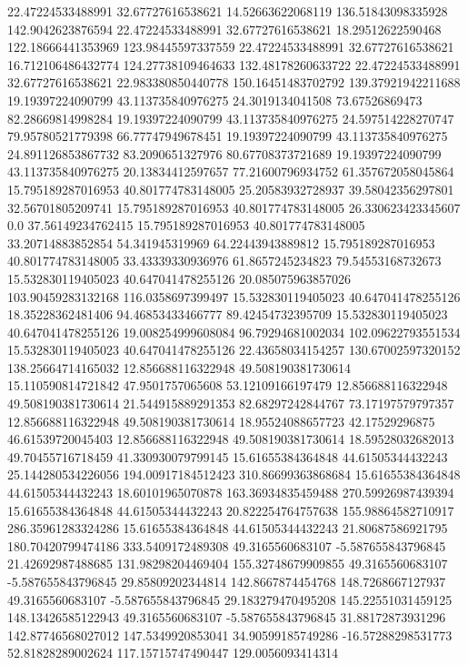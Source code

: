 22.47224533488991 32.67727616538621 14.52663622068119 136.51843098335928 142.9042623876594
22.47224533488991 32.67727616538621 18.29512622590468 122.18666441353969 123.98445597337559
22.47224533488991 32.67727616538621 16.712106486432774 124.27738109464633 132.48178260633722
22.47224533488991 32.67727616538621 22.983380850440778 150.16451483702792 139.37921942211688
19.19397224090799 43.113735840976275 24.3019134041508 73.67526869473 82.28669814998284
19.19397224090799 43.113735840976275 24.597514228270747 79.95780521779398 66.77747949678451
19.19397224090799 43.113735840976275 24.891126853867732 83.2090651327976 80.67708373721689
19.19397224090799 43.113735840976275 20.13834412597657 77.21600796934752 61.357672058045864
15.795189287016953 40.801774783148005 25.20583932728937 39.58042356297801 32.56701805209741
15.795189287016953 40.801774783148005 26.330623423345607 0.0 37.56149234762415
15.795189287016953 40.801774783148005 33.20714883852854 54.341945319969 64.22443943889812
15.795189287016953 40.801774783148005 33.43339330936976 61.8657245234823 79.54553168732673
15.532830119405023 40.647041478255126 20.085075963857026 103.90459283132168 116.0358697399497
15.532830119405023 40.647041478255126 18.35228362481406 94.46853433466777 89.42454732395709
15.532830119405023 40.647041478255126 19.008254999608084 96.79294681002034 102.09622793551534
15.532830119405023 40.647041478255126 22.43658034154257 130.67002597320152 138.25664714165032
12.856688116322948 49.508190381730614 15.110590814721842 47.9501757065608 53.12109166197479
12.856688116322948 49.508190381730614 21.544915889291353 82.68297242844767 73.17197579797357
12.856688116322948 49.508190381730614 18.95524088657723 42.17529296875 46.61539720045403
12.856688116322948 49.508190381730614 18.59528032682013 49.70455716718459 41.330930079799145
15.61655384364848 44.61505344432243 25.144280534226056 194.00917184512423 310.86699363868684
15.61655384364848 44.61505344432243 18.60101965070878 163.36934835459488 270.59926987439394
15.61655384364848 44.61505344432243 20.822254764757638 155.98864582710917 286.35961283324286
15.61655384364848 44.61505344432243 21.80687586921795 180.70420799474186 333.5409172489308
49.3165560683107 -5.587655843796845 21.42692987488685 131.98298204469404 155.32748679909855
49.3165560683107 -5.587655843796845 29.85809202344814 142.8667874454768 148.7268667127937
49.3165560683107 -5.587655843796845 29.183279470495208 145.22551031459125 148.13426585122943
49.3165560683107 -5.587655843796845 31.88172873931296 142.87746568027012 147.5349920853041
34.90599185749286 -16.57288298531773 52.81828289002624 117.15715747490447 129.0056093414314
